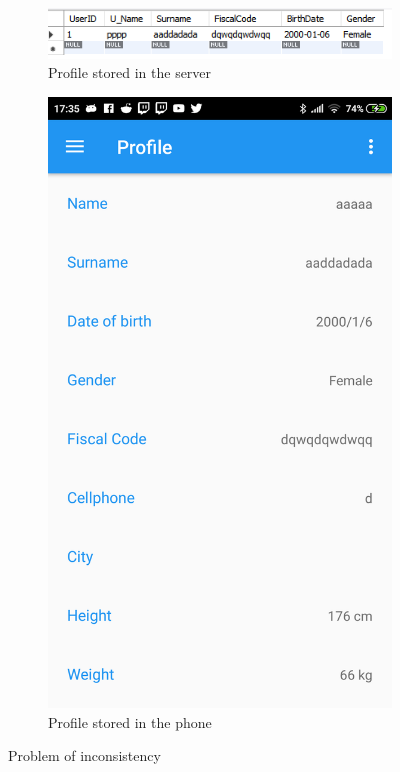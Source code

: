 \begin{figure}
\centering
\begin{subfigure}{.5\textwidth}
  \centering
   \includegraphics[scale=0.7]{resources/userdbnoupdate.png}
  \caption{Profile stored in the server}
  \label{fig:sub1}
\end{subfigure}%
\begin{subfigure}{.5\textwidth}
  \centering
   \includegraphics[scale=0.18]{resources/phoneprofile.png}
  \caption{Profile stored in the phone}
  \label{fig:sub2}
\end{subfigure}
\caption{Problem of inconsistency}
\label{fig:test}
\end{figure}

